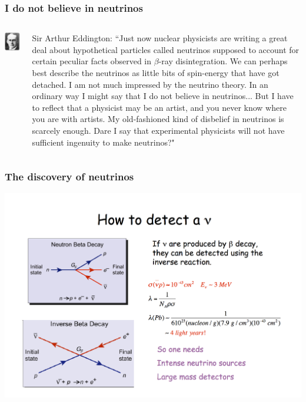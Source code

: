 \begin{frame}
\frametitle{I do not believe in neutrinos}
\begin{columns}
\includegraphics[scale=0.3]{img/eddington.png}
 
Sir Arthur Eddington: ``Just now nuclear physicists are writing a great deal about hypothetical particles called neutrinos supposed to account for certain peculiar facts observed in $\beta$-ray disintegration. We can perhaps best describe the neutrinos as little bits of spin-energy that have got detached. I am not much impressed by the neutrino theory. \alert{In an ordinary way I might say that I do not believe in neutrinos}... But I have to reflect that a physicist may be an artist, and you never know where you are with artists. My old-fashioned kind of disbelief in neutrinos is scarcely enough. \alert{Dare I say that experimental physicists will not have sufficient ingenuity to make neutrinos?"}

\end{columns}
\end{frame}

\begin{frame}
\frametitle{The discovery of neutrinos}

\includegraphics[scale=0.3]{img/DetectNeutrinos.png}

\end{frame}

